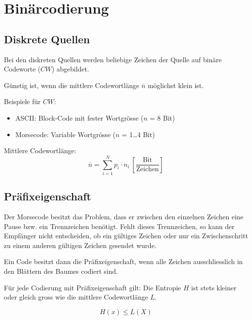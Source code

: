 \section{Binärcodierung}



\subsection{Diskrete Quellen}

Bei den diskreten Quellen werden beliebige Zeichen der Quelle auf binäre
Codeworte ($CW$) abgebildet.

Günstig ist, wenn die mittlere Codewortlänge $\overline{n}$ möglichst klein ist.

Beispiele für $CW$:
\begin{itemize}
	\item ASCII: Block-Code mit fester Wortgrösse ($n$ = 8 Bit)
	\item Morsecode: Variable Wortgrösse ($n$ = 1\ldots 4 Bit)
\end{itemize}

Mittlere Codewortlänge:
\[
	\overline{n} = \sum_{i=1}^N p_i \cdot n_i~\left[\frac{\textrm{Bit}}{\textrm{Zeichen}}\right]
\]


\subsection{Präfixeigenschaft}
\label{sec:praefixeigenschaft}

Der Morsecode besitzt das Problem, dass er zwischen den einzelnen Zeichen eine
Pause bzw. ein Trennzeichen benötigt. Fehlt dieses Trennzeichen, so kann der
Empfänger nicht entscheiden, ob ein gültiges Zeichen oder nur ein
Zwischenschritt zu einem anderen gültigen Zeichen gesendet wurde.

Ein Code besitzt dann die Präfixeigenschaft, wenn alle Zeichen ausschliesslich
in den Blättern des Baumes codiert sind.  

Für jede Codierung mit Präfixeigenschaft gilt: Die Entropie $H$ ist stets
kleiner oder gleich gross wie die mittlere Codewortlänge $L$.

\[
	H(x) \le L(X)
\]

